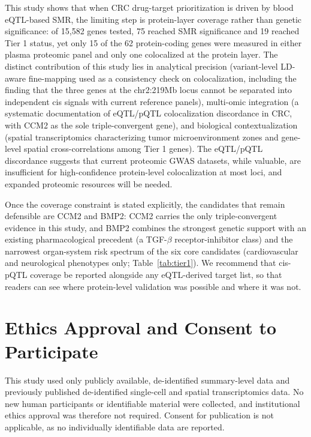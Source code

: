 \documentclass[11pt,a4paper]{article}
\begin{document}
This study shows that when CRC drug-target prioritization is driven by blood
eQTL-based SMR, the limiting step is protein-layer coverage rather than genetic
significance: of 15,582 genes tested, 75 reached SMR significance and 19 reached
Tier 1 status, yet only 15 of the 62 protein-coding genes were measured in either
plasma proteomic panel and only one colocalized at the protein layer. The
distinct contribution of this study
lies in analytical precision (variant-level LD-aware fine-mapping used as a
consistency check on colocalization, including the finding that the three genes
at the chr2:219Mb locus cannot be separated into independent cis signals with
current reference panels), multi-omic integration (a systematic documentation of
eQTL/pQTL colocalization discordance in CRC, with CCM2 as the sole
triple-convergent gene), and biological contextualization (spatial transcriptomics
characterizing tumor microenvironment zones and gene-level spatial
cross-correlations among Tier 1 genes). The eQTL/pQTL discordance suggests that current proteomic
GWAS datasets, while valuable, are insufficient for high-confidence
protein-level colocalization at most loci, and expanded proteomic resources
will be needed.

Once the coverage constraint is stated explicitly, the candidates that remain
defensible are CCM2 and BMP2: CCM2 carries the only triple-convergent evidence in
this study, and BMP2 combines the strongest genetic support with an existing
pharmacological precedent (a TGF-$\beta$ receptor-inhibitor class) and the
narrowest organ-system risk spectrum of the six core candidates (cardiovascular
and neurological phenotypes only; Table~\ref{tab:tier1}). We recommend that
cis-pQTL coverage be reported alongside any eQTL-derived target list, so that
readers can see where protein-level validation was possible and where it was not.




\section*{Ethics Approval and Consent to Participate}

This study used only publicly available, de-identified summary-level data and
previously published de-identified single-cell and spatial transcriptomics data.
No new human participants or identifiable material were
collected, and institutional ethics approval was therefore not required. Consent
for publication is not applicable, as no individually identifiable data are
reported.
\end{document}
